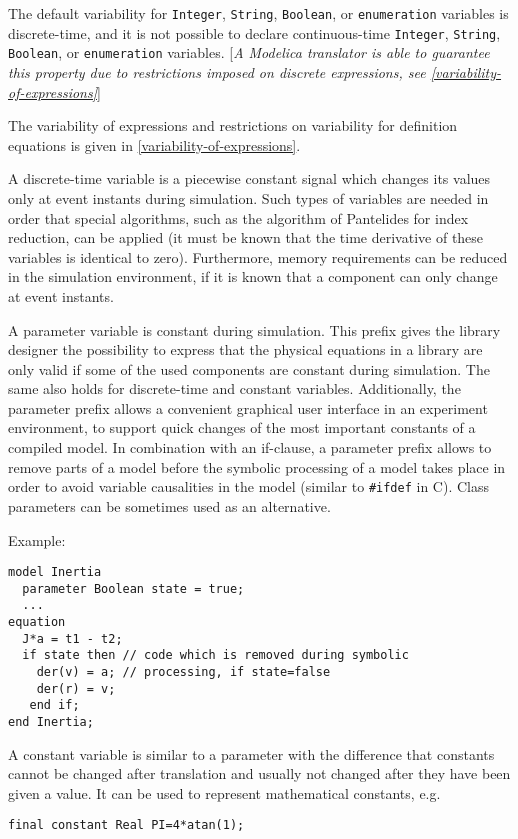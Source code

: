 The default variability for \lstinline!Integer!, \lstinline!String!,
\lstinline!Boolean!, or \lstinline!enumeration!
variables is discrete-time, and it is not possible to declare
continuous-time \lstinline!Integer!, \lstinline!String!, \lstinline!Boolean!, or
\lstinline!enumeration! variables.
{[}\emph{A Modelica translator is able to guarantee this property due to
restrictions imposed on discrete expressions, see \autoref{variability-of-expressions}}{]}

The variability of expressions and restrictions on variability for
definition equations is given in \autoref{variability-of-expressions}.

\begin{nonnormative}
A discrete-time variable is a piecewise constant signal which
changes its values only at event instants during simulation. Such types
of variables are needed in order that special algorithms, such as the
algorithm of Pantelides for index reduction, can be applied (it must be
known that the time derivative of these variables is identical to zero).
Furthermore, memory requirements can be reduced in the simulation
environment, if it is known that a component can only change at event
instants.

A parameter variable is constant during simulation. This prefix
gives the library designer the possibility to express that the physical
equations in a library are only valid if some of the used components are
constant during simulation. The same also holds for discrete-time and
constant variables. Additionally, the parameter prefix allows a
convenient graphical user interface in an experiment environment, to
support quick changes of the most important constants of a compiled
model. In combination with an if-clause, a parameter prefix allows to
remove parts of a model before the symbolic processing of a model takes
place in order to avoid variable causalities in the model (similar to
\lstinline!#ifdef! in C). Class parameters can be sometimes used as an alternative.

Example:
\begin{lstlisting}[language=modelica]
model Inertia
  parameter Boolean state = true;
  ...
equation
  J*a = t1 - t2;
  if state then // code which is removed during symbolic
    der(v) = a; // processing, if state=false
    der(r) = v;
   end if;
end Inertia;
\end{lstlisting}

A constant variable is similar to a parameter with the difference
that constants cannot be changed after translation and usually not
changed after they have been given a value. It can be used to represent
mathematical constants, e.g.
\begin{lstlisting}[language=modelica]
final constant Real PI=4*atan(1);
\end{lstlisting}


\end{nonnormative}
